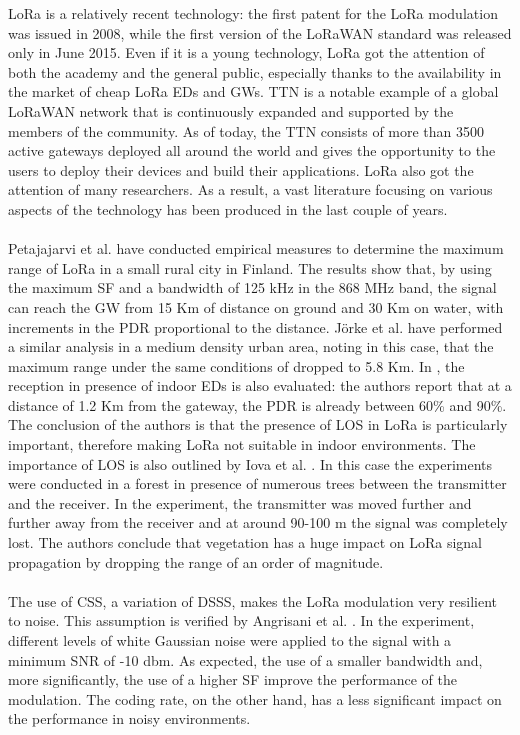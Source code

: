 LoRa is a relatively recent technology: the first patent for the LoRa modulation was issued in 2008, while the first version of the LoRaWAN standard was released only in June 2015. Even if it is a young technology, LoRa got the attention of both the academy and the general public, especially thanks to the availability in the market of cheap LoRa \glspl{ED} and \glspl{GW}. \gls{TTN} is a notable example of a global LoRaWAN network that is continuously expanded and supported by the members of the community. As of today, the \gls{TTN} consists of more than 3500 active gateways deployed all around the world and gives the opportunity to the users to deploy their devices and build their applications. LoRa also got the attention of many researchers. As a result, a vast literature focusing on various aspects of the technology has been produced in the last couple of years. \\ \\
Petajajarvi et al. \cite{ref:soa-lora-range1} have conducted empirical measures to determine the maximum range of LoRa in a small rural city in Finland. The results show that, by using the maximum \gls{SF} and a bandwidth of 125 kHz in the 868 MHz band, the signal can reach the \gls{GW} from 15 Km of distance on ground and 30 Km on water, with increments in the \gls{PDR} proportional to the distance. Jörke et al. \cite{ref:soa-lora-range2} have performed a similar analysis in a medium density urban area, noting in this case, that the maximum range under the same conditions of \cite{ref:soa-lora-range1} dropped to 5.8 Km. In \cite{ref:soa-lora-range3}, the reception in presence of indoor \glspl{ED} is also evaluated: the authors report that at a distance of 1.2 Km from the gateway, the \gls{PDR} is already between 60\% and 90\%. The conclusion of the authors is that the presence of \gls{LOS} in LoRa is particularly important, therefore making LoRa not suitable in indoor environments. The importance of \gls{LOS} is also outlined by Iova et al. \cite{ref:soa-lora-mountains}. In this case the experiments were conducted in a forest in presence of numerous trees between the transmitter and the receiver. In the experiment, the transmitter was moved further and further away from the receiver and at around 90-100 m the signal was completely lost. The authors conclude that vegetation has a huge impact on LoRa signal propagation by dropping the range of an order of magnitude. \\ \\
The use of \gls{CSS}, a variation of \gls{DSSS}, makes the LoRa modulation very resilient to noise. This assumption is verified by Angrisani et al. \cite{ref:soa-lora-noise}. In the experiment, different levels of white Gaussian noise were applied to the signal with a minimum SNR of -10 dbm. As expected, the use of a smaller bandwidth and, more significantly, the use of a higher \gls{SF} improve the performance of the modulation. The coding rate, on the other hand, has a less significant impact on the performance in noisy environments. \\ \\
